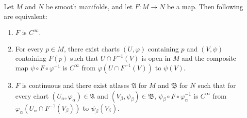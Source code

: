 \begin{comment}
We show now that smoothness implies continuity, and that the smoothness of a map is independent of the choice of charts.

\begin{lemma}\label{lem:smooth map is continuous}
    Let $M, N$ be smooth manifolds, and let $F : M \to N$ be a smooth map.
    \begin{enumerate}
        \item If $(U, \varphi)$ is arbitrary chart containing $p \in M$ and $(V, \psi)$ is arbitrary chart containing $F(p) \in N$, then $\psi\circ F \circ \varphi^{-1}$ is $C^\infty$ on $M$.
    \end{enumerate}
\end{lemma}

\begin{proof}
    (i) Let $p \in M$ be arbitrary. Suppose that $F$ is smooth at $p$. By definition, there are charts $(U, \varphi)$ containing $p \in M$ and $(V, \psi)$ containing $F(p) \in N$ such that $F(U) \subset V$ and the composite $\psi \circ F \circ \varphi^{-1}$ is $C^\infty$ at $\varphi(p)$ from $\varphi(U)$ to $\psi(V)$, hence $F$ is continuous on $\varphi(U)$. Since $\varphi : U \to \varphi(U)$ and $\psi : V \to \psi(V)$ are homeomorphisms, then the composite of continuous maps $F = \psi^{-1} \circ (\psi \circ F \circ \varphi^{-1}) \circ \varphi$ from $U$ to $V$ is also continuous. Since $p$ is arbitrary, $F$ is continuous.
\end{proof}
\end{comment}

\begin{proposition}\label{lem:characterisation of smooth maps}
    Let $M$ and $N$ be smooth manifolds, and let $F : M \to N$ be a map. Then following are equivalent:
    \begin{enumerate}
        \item $F$ is $C^\infty$.
        \item For every $p \in M$, there exist charts $(U, \varphi)$ containing $p$ and $(V, \psi)$ containing $F(p)$ such that $U \cap F^{-1}(V)$ is open in $M$ and the composite map $\psi \circ F \circ \varphi^{-1}$ is $C^\infty$ from $\varphi(U \cap F^{-1}(V))$ to $\psi(V)$.
        \item $F$ is continuous and there exist atlases $\mathfrak{A}$ for $M$ and $\mathfrak{B}$ for $N$ such that for every chart $(U_\alpha, \varphi_\alpha) \in \mathfrak{A}$ and $(V_\beta, \psi_\beta) \in \mathfrak{B}$, $\psi_\beta \circ F \circ \varphi_\alpha^{-1}$ is $C^\infty$ from $\varphi_\alpha(U_\alpha \cap F^{-1}(V_\beta))$ to $\psi_\beta(V_\beta)$.
    \end{enumerate}
\end{proposition}

